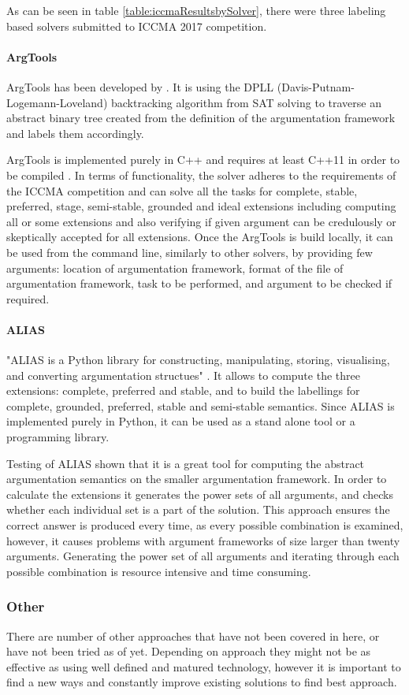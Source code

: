 As can be seen in table \ref{table:iccmaResultsbySolver}, there were three labeling based solvers submitted to ICCMA 2017 competition. 

\paragraph{ArgTools}
ArgTools has been developed by \citet{argtools}. It is using the DPLL (Davis-Putnam-Logemann-Loveland) backtracking algorithm from SAT solving \citep{bierehandbook} to traverse an abstract binary tree created from the definition of the argumentation framework and labels them accordingly. 
 
ArgTools is implemented purely in C++ and requires at least C++11 in order to be compiled \citep{argtools}. In terms of functionality, the solver adheres to the requirements of the ICCMA competition and can solve all the tasks for complete, stable, preferred, stage, semi-stable, grounded and ideal extensions including computing all or some extensions and also verifying if given argument can be credulously or skeptically accepted for all extensions. Once the ArgTools is build locally, it can be used from the command line, similarly to other solvers, by providing few arguments: location of argumentation framework, format of the file of argumentation framework, task to be performed, and argument to be checked if required. 

\paragraph{ALIAS}  \label{section:alias}

"ALIAS is a Python library for constructing, manipulating, storing, visualising, and converting argumentation structues" \citep{alias}. It allows to compute the three extensions: complete, preferred and stable, and to build the labellings for complete, grounded, preferred, stable and semi-stable semantics. Since ALIAS is implemented purely in Python, it can be used as a stand alone tool or a programming library. 

Testing of ALIAS shown that it is a great tool for computing the abstract argumentation semantics on the smaller argumentation framework. In order to calculate the extensions it generates the power sets of all arguments, and checks whether each individual set is a part of the solution. This approach ensures the correct answer is produced every time, as every possible combination is examined, however, it causes problems with argument frameworks of size larger than twenty arguments. Generating the power set of all arguments and iterating through each possible combination is resource intensive and time consuming. 


\subsubsection{Other}
There are number of other approaches that have not been covered in here, or have not been tried as of yet. Depending on approach they might not be as effective as using well defined and matured technology, however it is important to find a new ways and constantly improve existing solutions to find best approach.